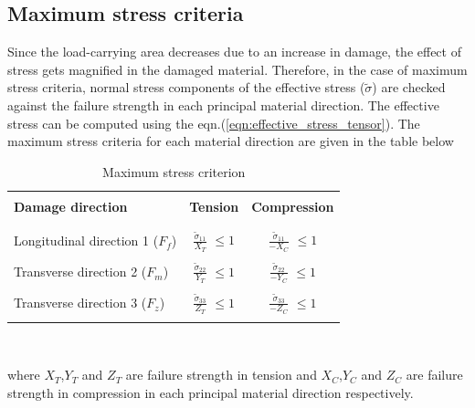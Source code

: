 \documentclass[12pt,twoside]{report}
\begin{document}
\subsection{Maximum stress criteria}\label{Maximum stress criteria}
\indent\indent\indent  Since the load-carrying area decreases due to an increase in damage, the effect of stress gets magnified in the damaged material. Therefore, in the case of maximum stress criteria, normal stress components of the effective stress ($\tilde{\sigma}$) are checked against the failure strength in each principal material direction. The effective stress can be computed using the eqn.(\ref{eqn:effective_stress_tensor}). The maximum stress criteria for each material direction are given in the table below
\begin{table}[htbp]
  \begin{center}
     \begin{tabular}{l  c  c} 
     \hline
     \\
      \textbf{Damage direction} \;\;& \textbf{Tension} \;& \textbf{Compression}\\
      \\
      \hline
      \\
      Longitudinal direction 1 ($F_{f}$) & \Large{$\frac{\tilde{\sigma}_{11}}{X_{T}} $}\small{ $\leq 1$} & \Large{$\frac{\tilde{\sigma}_{11}}{-X_{C}} $}\small{ $\leq 1$} \\
      \\
      Transverse direction 2 ($F_{m}$)  &  \Large{$\frac{\tilde{\sigma}_{22}}{Y_{T}} $}\small{ $\leq 1$}  & \Large{$\frac{\tilde{\sigma}_{22}}{-Y_{C}} $}\small{ $\leq 1$}\\
      \\
      Transverse direction 3 ($F_{z}$) &  \Large{$\frac{\tilde{\sigma}_{33}}{Z_{T}} $}\small{ $\leq 1$}  &   \Large{$\frac{\tilde{\sigma}_{33}}{-Z_{C}} $}\small{ $\leq 1$}\\
       \\
       \hline
    \end{tabular}
    \\
    \caption{Maximum stress criterion}
    \label{tab:Maximum stress criterion}
  \end{center}
\end{table}
\FloatBarrier
where $X_{T}$,$ Y_{T} $ and $Z_{T}$ are failure strength in tension and $X_{C}$,$ Y_{C} $ and $Z_{C}$ are failure strength in compression in each principal material direction respectively.\\
\\
\end{document}
